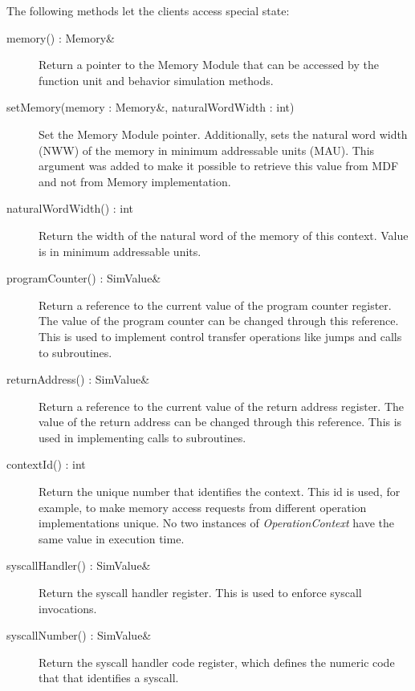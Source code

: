 \documentclass[a4paper,twoside]{tce}
\begin{document}
The following methods let the clients access special state:
\begin{description}
\item[memory() : Memory\&]%

  Return a pointer to the Memory Module that can be accessed by the
  function unit and behavior simulation methods. 
  
\item[setMemory(memory : Memory\&, naturalWordWidth : int)]%

  Set the Memory Module pointer. Additionally, sets the natural word width
  (NWW) of the memory in minimum addressable units (MAU). This argument was
  added to make it possible to retrieve this value from MDF and not from
  Memory implementation.

\item[naturalWordWidth() : int]%

  Return the width of the natural word of the memory of this context. Value is
  in minimum addressable units. 

\item[programCounter() : SimValue\&]%

  Return a reference to the current value of the program counter register.
  The value of the program counter can be changed through this reference.
  This is used to implement control transfer operations like jumps and
  calls to subroutines. 

\item[returnAddress() : SimValue\&] %

  Return a reference to the current value of the return address
  register.  The value of the return address can be changed through
  this reference.  This is used in implementing calls to
  subroutines. 

\item[contextId() : int] %
  
  Return the unique number that identifies the context. This id is used,
  for example, to make memory access requests from different operation
  implementations unique.  No two instances of \emph{OperationContext} have
  the same value in execution time. 

\item[syscallHandler() : SimValue\&] %
  
  Return the syscall handler register. This is used to enforce syscall
  invocations.

\item[syscallNumber() : SimValue\&] %
  
  Return the syscall handler code register, which defines the numeric code
  that that identifies a syscall.

\end{description}
\end{document}
